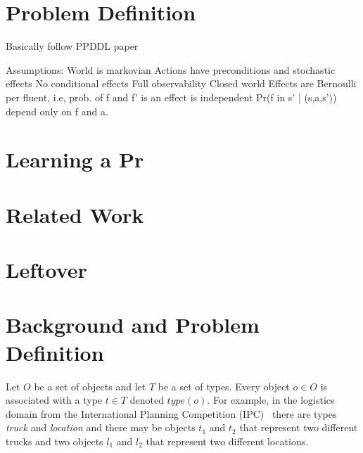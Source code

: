 \documentclass{article}
\newcommand{\type}{\textit{type}}
\begin{document}
\section{Problem Definition}

Basically follow PPDDL paper 

Assumptions:
World is markovian
Actions have preconditions and stochastic effects
No conditional effects
Full observability 
Closed world
Effects are Bernoulli per fluent, i.e, prob. of f and f’ is an effect is independent 
Pr(f in s’ | (s,a,s’)) depend only on f and a. 


\section{Learning a Pr}


\section{Related Work}









\pagebreak
\section{Leftover}


\section{Background and Problem Definition}

Let $O$ be a set of objects and let $T$ be a set of types. 
Every object $o\in O$ is associated with a type $t\in T$ denoted $\type(o)$. 
For example, in the logistics domain from the International Planning Competition (IPC)~\cite{ipc} there are types \emph{truck} and \emph{location} and there may be objects $t_1$ and $t_2$ that represent two different trucks and two objects $l_1$ and $l_2$ that represent two different locations. 
\end{document}
